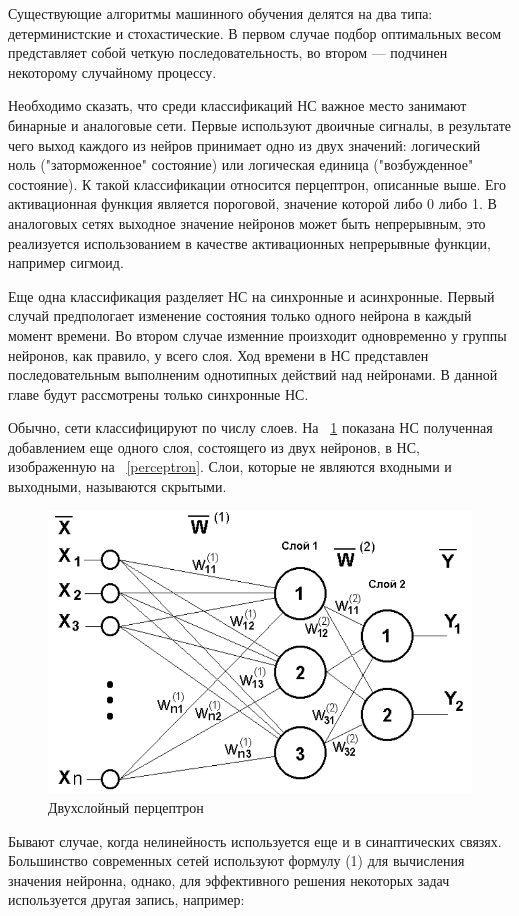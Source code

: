 \documentclass[a4paper,english,russian]{G2-105}
\begin{document}
\par Существующие алгоритмы машинного обучения делятся на два типа: детерминистские и стохастические. В первом случае подбор оптимальных весом представляет собой четкую последовательность, во втором --- подчинен некоторому случайному процессу. 
\par Необходимо сказать, что среди классификаций НС важное место занимают бинарные и аналоговые сети. Первые используют двоичные сигналы, в результате чего выход каждого из нейров принимает одно из двух значений: логический ноль ("заторможенное" состояние) или логическая единица ("возбужденное" состояние). К такой классификации относится перцептрон, описанные выше. Его активационная функция является пороговой, значение которой либо 0 либо 1. В аналоговых сетях выходное значение нейронов может быть непрерывным, это реализуется использованием в качестве активационных непрерывные функции, например сигмоид. 
\par Еще одна классификация разделяет НС на синхронные и асинхронные. Первый случай предпологает изменение состояния только одного нейрона в каждый момент времени. Во втором случае изменние произходит одновременно у группы нейронов, как правило, у всего слоя. Ход времени в НС представлен последовательным выполненим однотипных действий над нейронами. В данной главе будут рассмотрены только синхронные НС.
\par Обычно, сети классифицируют по числу слоев. На ~\ref{perceptron2} показана НС полученная добавлением еще одного слоя, состоящего из двух нейронов, в НС, изображенную на ~\ref{perceptron}. Слои, которые не являются входными и выходными, называются скрытыми. 
\begin{figure}
    \includegraphics[width=0.6\linewidth]{perceptron2.png}
    \caption{Двухслойный перцептрон}
	\label{perceptron2}
\end{figure} 
\par Бывают случае, когда нелинейность используется еще и в синаптических связях. Большинство современных сетей используют формулу (1) для вычисления значения нейронна, однако, для эффективного решения некоторых задач используется другая запись, например:
\end{document}
